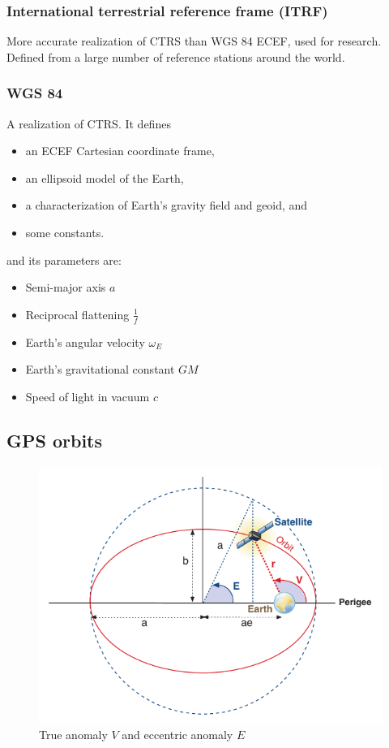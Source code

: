 \subsubsection{International terrestrial reference frame (ITRF)}
More accurate realization of CTRS than WGS 84 ECEF, used for research. Defined from a large number of reference stations around the world.

\subsubsection{WGS 84}
A realization of CTRS. It defines
\begin{itemize}
    \item an ECEF Cartesian coordinate frame,
    \item an ellipsoid model of the Earth,
    \item a characterization of Earth's gravity field and geoid, and
    \item some constants.
\end{itemize}
and its parameters are:
\begin{itemize}
    \item Semi-major axis $a$
    \item Reciprocal flattening $\frac{1}{f}$
    \item Earth's angular velocity $\omega_E$
    \item Earth's gravitational constant $GM$
    \item Speed of light in vacuum $c$
\end{itemize}

\subsection{GPS orbits}

\begin{figure}[htbp]
    \centering
    \includegraphics[width=\linewidth]{img/satellite-anomalies.pdf}
    \caption{True anomaly $V$ and eccentric anomaly $E$}
    \label{fig:orbital-anomalies}
\end{figure}




